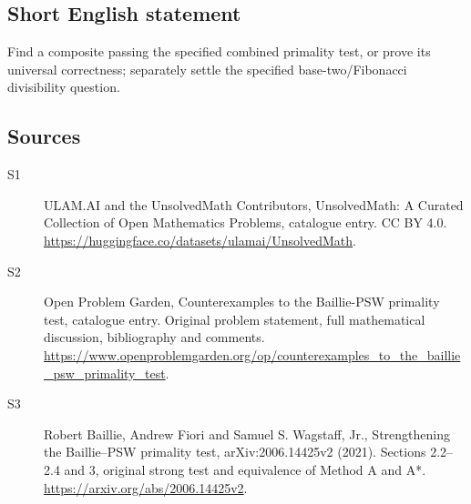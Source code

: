 \documentclass[11pt]{article}
\begin{document}
\subsection{Short English statement}
Find a composite passing the specified combined primality test, or prove its universal correctness; separately settle the specified base-two/Fibonacci divisibility question.
\subsection{Sources}
\begin{description}
\item[\hypertarget{source:statement:1}{S1}] ULAM.AI and the UnsolvedMath Contributors, UnsolvedMath: A Curated Collection of Open Mathematics Problems, catalogue entry. CC BY 4.0. \url{https://huggingface.co/datasets/ulamai/UnsolvedMath}.
\item[\hypertarget{source:statement:2}{S2}] Open Problem Garden, Counterexamples to the Baillie-PSW primality test, catalogue entry. Original problem statement, full mathematical discussion, bibliography and comments. \url{https://www.openproblemgarden.org/op/counterexamples_to_the_baillie_psw_primality_test}.
\item[\hypertarget{source:statement:3}{S3}] Robert Baillie, Andrew Fiori and Samuel S. Wagstaff, Jr., Strengthening the Baillie--PSW primality test, arXiv:2006.14425v2 (2021). Sections 2.2--2.4 and 3, original strong test and equivalence of Method A and A*. \url{https://arxiv.org/abs/2006.14425v2}.
\end{description}
\label{end:statement}
\end{document}
